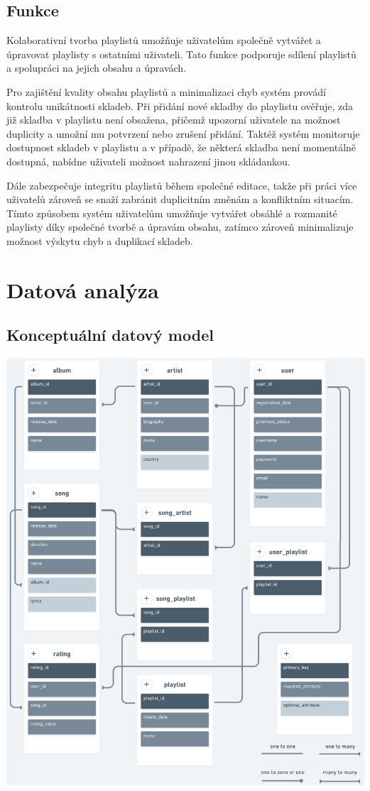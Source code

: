 \documentclass[czech,12pt,a4paper,titlepage]{article}
\begin{document}
    \subsection*{Funkce}
    Kolaborativní tvorba playlistů umožňuje uživatelům společně vytvářet a úpravovat playlisty s ostatními uživateli.
    Tato funkce podporuje sdílení playlistů a spolupráci na jejich obsahu a úpravách.


    Pro zajištění kvality obsahu playlistů a minimalizaci chyb systém provádí kontrolu unikátnosti skladeb.
    Při přidání nové skladby do playlistu ověřuje, zda již skladba v playlistu není obsažena, přičemž upozorní
    uživatele na možnost duplicity a umožní mu potvrzení nebo zrušení přidání.
    Taktéž systém monitoruje dostupnost skladeb v playlistu a v případě, že některá skladba není momentálně dostupná,
    nabídne uživateli možnost nahrazení jinou skládankou.


    Dále zabezpečuje integritu playlistů během společné editace, takže při práci více uživatelů
    zároveň se snaží zabránit duplicitním změnám a konfliktním situacím.
    Tímto způsobem systém uživatelům umožňuje vytvářet obsáhlé a rozmanité playlisty díky společné tvorbě a úpravám obsahu,
    zatímco zároveň minimalizuje možnost výskytu chyb a duplikací skladeb.
    \clearpage


    \section{Datová analýza}\label{sec:datova-analyza}
    \subsection*{Konceptuální datový model}
    \bigskip
    \bigskip
    \includegraphics[width=0.9 \textwidth, center]{konceptualni_datovy_model}
\end{document}
